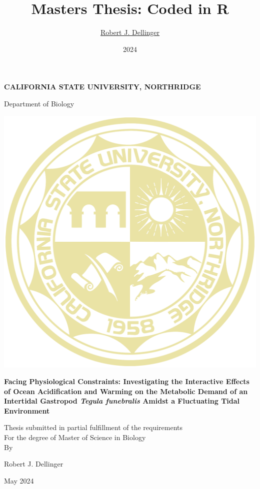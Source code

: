 \documentclass[
  12pt,
]{article}
\title{Masters Thesis: Coded in R}
\author{\href{https://robdellinger.com}{Robert J. Dellinger}}
\date{2024}
\begin{document}
\maketitle

\newpage
\pagestyle{empty}

\allsectionsfont{\centering}
\subsectionfont{\raggedright}
\subsubsectionfont{\raggedright}

\begin{centering}

\vspace{1 in}
{\bf CALIFORNIA STATE UNIVERSITY, NORTHRIDGE}

\vspace{0.1 in}
{Department of Biology}
\vspace{0.2 in}



\includegraphics[width=0.3\linewidth]{Images/university_logo} 


\vspace{0.1 in}

\doublespacing
{\bf Facing Physiological Constraints: Investigating the Interactive Effects of Ocean Acidification and Warming on the Metabolic Demand of an Intertidal Gastropod \emph{Tegula funebralis} Amidst a Fluctuating Tidal Environment \\}

\vspace{0.3 in}

Thesis submitted in partial fulfillment of the requirements\\
For the degree of Master of Science in Biology \\

\vspace{0.4 in}
\singlespacing
By

\vspace{0.1 in}
{Robert J. Dellinger}

\vspace{2 in}
May 2024

\end{centering}
\doublespacing
\end{document}

